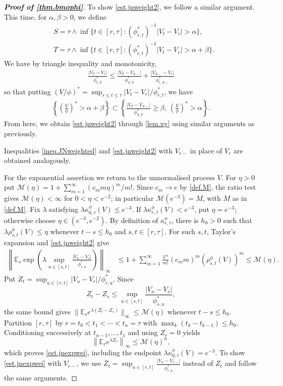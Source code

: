 \documentclass[12pt,oneside,reqno,fleqn]{amsart}
\numberwithin{equation}{section}
\theoremstyle{remark}
\newcommand\cmm{{\mathcal M}}
\newcommand\mE{{\mathbb E}}
\newcommand\E{\mE}
\newcommand{\1}{{\mathbf 1}}
\renewcommand{\le}{\leq}
\renewcommand{\ge}{\geq}
\begin{document}
\begin{proof}[\bf Proof of \cref{thm.bmophi}]
		To show \eqref{est.jnweight2}, we follow a similar argument. This time, for $\alpha,\beta>0$, we define
		\begin{align*}
			&S=\tau\wedge\inf\{t\in[r,\tau]:(\phi^*_{r,t})^{-1} |V_t-V_{r}|> \alpha\}, 
			\\&T=\tau\wedge\inf\{t\in[r,\tau]:(\phi^*_{r,t})^{-1} |V_t-V_{r}|> \alpha+\beta\}.
		\end{align*}
		We have by triangle inequality and monotonicity,
		\begin{align*}
			\frac{|V_T-V_{r}|}{\phi^*_{r,T}}\le \frac{|V_T-V_{S-}|}{\phi^*_{S,T}}+\frac{|V_{S-}-V_{r}|}{\phi^*_{r,S-}}
		\end{align*}
		so that putting $(V/\phi)^*=\sup_{r\le t\le \tau}|V_t-V_r|/\phi^*_{r,t}$, we have
		\begin{align*}
			\left\{\left(\frac V \phi\right)^* > \alpha+\beta\right\}\subset\left\{\frac{|V_T-V_{S-}|}{\phi^*_{S,T}}\ge \beta,\ \left(\frac V \phi\right)^*> \alpha\right\}.
		\end{align*}
		From here, we obtain \eqref{est.jnweight2} through \cref{lem.xy} using similar arguments as previously.

		Inequalities \eqref{ineq.JNweighted} and \eqref{est.jnweight2} with  $V_{r-}$ in place of $V_r$ are obtained analogously.

		For the exponential assertion we return to the unnormalised process $V$. For $\eta>0$ put $\cmm(\eta)=1+\sum_{m=1}^\infty(c_mm\eta)^m/m!$. Since $c_m\to e$ by \eqref{def.M}, the ratio test gives $\cmm(\eta)<\infty$ for $0<\eta<e^{-2}$; in particular $\cmm(e^{-3})=M$, with $M$ as in \eqref{def.M}. Fix $\lambda$ satisfying $\lambda\kappa^\phi_{0,\tau}(V)\le e^{-3}$. If $\lambda\kappa^\phi_{r,\tau}(V)<e^{-3}$, put $\eta=e^{-3}$; otherwise choose $\eta\in(e^{-3},e^{-2})$. By definition of $\kappa^\phi_{r,\tau}$, there is $h_0>0$ such that $\lambda\rho^\phi_{s,t}(V)\le\eta$ whenever $t-s\le h_0$ and $s,t\in[r,\tau]$. For such $s,t$, Taylor's expansion and \eqref{est.jnweight2} give
		\begin{align*}
			\left\|\E_s \exp\left({\lambda\sup_{u\in[s,t]}\frac{|V_u-V_s|}{\phi^*_{s,u}}}\right)\right\|_\infty
			&\le1+\sum_{m=1}^\infty\frac{\lambda^m}{m!}(c_mm)^m(\rho^\phi_{s,t}(V))^m
			\le\cmm(\eta).
		\end{align*}
		Put $Z_t=\sup_{u\in[r,t]}|V_u-V_r|/\phi^*_{r,u}$. Since
		\[
			Z_t-Z_s\le\sup_{u\in[s,t]}\frac{|V_u-V_s|}{\phi^*_{s,u}},
		\]
		the same bound gives $\|\E_s e^{\lambda(Z_t-Z_s)}\|_\infty\le\cmm(\eta)$ whenever $t-s\le h_0$. Partition $[r,\tau]$ by $r=t_0<t_1<\cdots<t_n=\tau$ with $\max_k(t_k-t_{k-1})\le h_0$. Conditioning successively at $t_{n-1},\ldots,t_1$ and using $Z_r=0$ yields
		\[
			\left\|\E_r e^{\lambda Z_\tau}\right\|_\infty\le\cmm(\eta)^n,
		\]
		which proves \eqref{est.jnexpwei}, including the endpoint $\lambda\kappa^\phi_{0,\tau}(V)=e^{-3}$.
		To show \eqref{est.jnexpwei} with $V_{r-}$, we use $\bar Z_t=\sup_{u\in[r,t]}\frac{|V_u-V_{r-}|}{\phi^*_{r,u}}$ instead of $Z_t$ and follow the same arguments.
	\end{proof}
\end{document}
